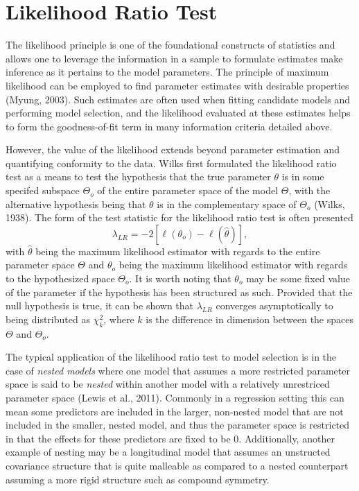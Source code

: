 		\section{Likelihood Ratio Test}

		The likelihood principle is one of the foundational constructs of statistics and allows one to leverage the information in a sample to formulate estimates make inference as it pertains
		to the model parameters. The principle of maximum likelihood can be employed to find parameter estimates with desirable properties (Myung, 2003). Such estimates are often used when
		fitting candidate models and performing model selection, and the likelihood evaluated at these estimates helps to form the goodness-of-fit term in many information criteria detailed
		above.

		However, the value of the likelihood extends beyond parameter estimation and quantifying conformity to the data. Wilks first formulated the likelihood ratio test as a means to test the
		hypothesis that the true parameter $\theta$ is in some specifed subspace $\Theta_o$ of the entire parameter space of the model $\Theta$, with the alternative hypothesis being that
		$\theta$ is in the complementary space of $\Theta_o$ (Wilks, 1938). The form of the test statistic for the likelihood ratio test is often presented
		\begin{equation}
			\lambda_{LR} = -2 \left[ \ell (\theta_o) - \ell (\hat{\theta}) \right] ,
		\end{equation}
		with $\hat{\theta}$ being the maximum likelihood estimator with regards to the entire parameter space $\Theta$ and $\theta_o$ being the maximum likelihood estimator with regards to the
		hypothesized space $\Theta_o$. It is worth noting that $\theta_o$ may be some fixed value of the parameter if the hypothesis has been structured as such. Provided that the null hypothesis
		is true, it can be shown that $\lambda_{LR}$ converges asymptotically to being distributed as $\chi^2_{k}$, where $k$ is the difference in dimension between the spaces $\Theta$ and
		$\Theta_o$.

		The typical application of the likelihood ratio test to model selection is in the case of \textit{nested models} where one model that assumes a more restricted parameter space is said
		to be \textit{nested} within another model with a relatively unrestriced parameter space (Lewis et al., 2011). Commonly in a regression setting this can mean some predictors are
		included in the larger, non-nested model that are not included in the smaller, nested model, and thus the parameter space is restricted in that the effects for these predictors are
		fixed to be 0. Additionally, another example of nesting may be a longitudinal model that assumes an unstructed covariance structure that is quite malleable as compared to a nested
		counterpart assuming a more rigid structure such as compound symmetry.

